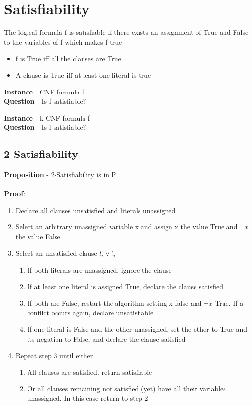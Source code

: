 \documentclass{article}[18pt]
\begin{document}
\section{Satisfiability}
\begin{definition}[Satisfiable]
The logical formula f is satisfiable if there exists an assignment of True and False to the variables of f which makes f true
\end{definition}
\begin{itemize}
	\item f is True iff all the clauses are True
	\item A clause is True iff at least one literal is true
\end{itemize}
\begin{problem}[Satisfiability]
\textbf{Instance} - CNF formula f\\
\textbf{Question} - Is f satisfiable?
\end{problem}

\begin{problem}[k-Satisfiability]
\textbf{Instance} - k-CNF formula f\\
\textbf{Question} - Is f satisfiable?
\end{problem}
\subsection{2 Satisfiability}
\textbf{Proposition} - 2-Satisfiability is in P\\
\\
\textbf{Proof}:
\begin{enumerate}
	\item Declare all clauses unsatisfied and literals unassigned
	\item Select an arbitrary unassigned variable x and assign x the value True and $\lnot x$ the value False
	\item Select an unsatisfied clause $l_i\lor l_j$
	\begin{enumerate}
		\item If both literals are unassigned, ignore the clause
		\item If at least one literal is assigned True, declare the clause satisfied
		\item If both are False, restart the algorithm setting x false and $\lnot x$ True. If a conflict occurs again, declare unsatisfiable
		\item If one literal is False and the other unassigned, set the other to True and its negation to False, and declare the clause satisfied
	\end{enumerate}
	\item Repeat step 3 until either
	\begin{enumerate}
		\item All clauses are satisfied, return satisfiable
		\item Or all clauses remaining not satisfied (yet) have all their variables unassigned. In this case return to step 2
	\end{enumerate}
\end{enumerate}
\end{document}
